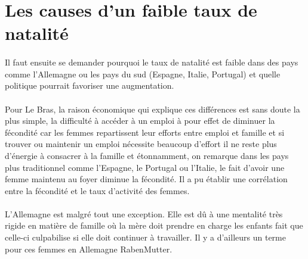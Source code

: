 \section{Les causes d'un faible taux de natalité}
\paragraph{}Il faut ensuite se demander pourquoi le taux de natalité est faible dans des pays comme l’Allemagne ou les pays du sud (Espagne, Italie, Portugal)\citep{4model}  et quelle politique pourrait favoriser une augmentation. 

\paragraph{}Pour Le Bras, la raison économique qui explique ces différences est sans doute la plus simple, la difficulté à accéder à un emploi à pour effet de diminuer la fécondité\citep[pp.25]{heran} car les femmes repartissent leur efforts entre emploi et famille et si trouver ou maintenir un emploi nécessite beaucoup d’effort il ne reste plus d’énergie à consacrer à la famille et étonnamment, on remarque dans les pays plus traditionnel comme l’Espagne, le Portugal ou l’Italie, le fait d’avoir une femme maintenu au foyer diminue la fécondité. Il a pu établir une corrélation entre la fécondité et le taux d'activité des femmes. 

\paragraph{}L’Allemagne est malgré tout une exception. Elle est dû à une mentalité très rigide en matière de famille où la mère doit prendre en charge les enfants fait que celle-ci culpabilise si elle doit continuer à travailler. Il y a d’ailleurs un terme pour ces femmes en Allemagne RabenMutter\citep{mutter}. 

